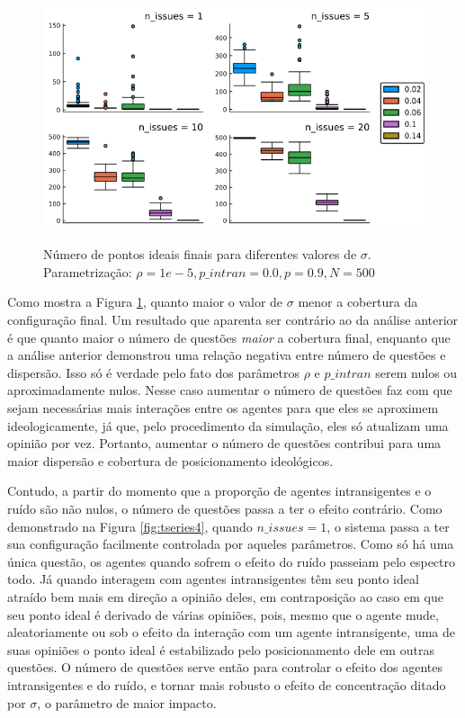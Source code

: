   \begin{figure}[H]
    \centering
    \caption{Número de pontos ideais finais para diferentes valores de \(\sigma\).
      Parametrização: \(\rho =1e-5, p\_intran = 0.0, p = 0.9, N =500\)}
    \includegraphics[scale=0.7]{ims/boxes4.png}
    \label{fig:box4}
  \end{figure}
  
  Como mostra a Figura \ref{fig:box4}, quanto maior o valor de \(\sigma\) menor
  a cobertura da configuração final. Um resultado que aparenta ser contrário ao
  da análise anterior é que quanto maior o número de questões \textit{maior} a
  cobertura final, enquanto que a análise anterior demonstrou uma relação
  negativa entre número de questões e dispersão. Isso só é verdade pelo fato dos
  parâmetros \(\rho\) e \(p\_intran\) serem nulos ou aproximadamente nulos.
  Nesse caso aumentar o número de questões faz com que sejam necessárias mais
  interações entre os agentes para que eles se aproximem ideologicamente, já
  que, pelo procedimento da simulação, eles só atualizam uma opinião por vez.
  Portanto, aumentar o número de questões contribui para uma maior dispersão e
  cobertura de posicionamento ideológicos.
  
  Contudo, a partir do momento que a proporção de agentes intransigentes e o
  ruído são não nulos, o número de questões passa a ter o efeito contrário. Como
  demonstrado na Figura \ref{fig:tseries4}, quando \(n\_issues = 1\), o sistema
  passa a ter sua configuração facilmente controlada por aqueles parâmetros.
  Como só há uma única questão, os agentes quando sofrem o efeito do ruído
  passeiam pelo espectro todo. Já quando interagem com agentes intransigentes
  têm seu ponto ideal atraído bem mais em direção a opinião deles, em
  contraposição ao caso em que seu ponto ideal é derivado de várias opiniões,
  pois, mesmo que o agente mude, aleatoriamente ou sob o efeito da interação com
  um agente intransigente, uma de suas opiniões o ponto ideal é
  estabilizado pelo posicionamento dele em outras questões. O número de questões
  serve então para controlar o efeito dos agentes intransigentes e do ruído, e
  tornar mais robusto o efeito de concentração ditado por \(\sigma\), o
  parâmetro de maior impacto.

